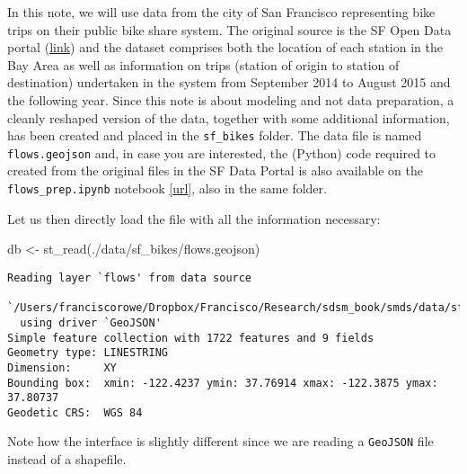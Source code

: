 \documentclass[
  letterpaper,
  krantz2]{style/krantz}
\newenvironment{Shaded}{\begin{snugshade}}{\end{snugshade}}
\newcommand{\CommentTok}[1]{\textcolor[rgb]{0.37,0.37,0.37}{#1}}
\newcommand{\FunctionTok}[1]{\textcolor[rgb]{0.28,0.35,0.67}{#1}}
\newcommand{\NormalTok}[1]{\textcolor[rgb]{0.00,0.23,0.31}{#1}}
\newcommand{\OtherTok}[1]{\textcolor[rgb]{0.00,0.23,0.31}{#1}}
\newcommand{\StringTok}[1]{\textcolor[rgb]{0.13,0.47,0.30}{#1}}
\begin{document}
In this note, we will use data from the city of San Francisco
representing bike trips on their public bike share system. The original
source is the SF Open Data portal
(\href{http://www.bayareabikeshare.com/open-data}{link}) and the dataset
comprises both the location of each station in the Bay Area as well as
information on trips (station of origin to station of destination)
undertaken in the system from September 2014 to August 2015 and the
following year. Since this note is about modeling and not data
preparation, a cleanly reshaped version of the data, together with some
additional information, has been created and placed in the
\texttt{sf\_bikes} folder. The data file is named \texttt{flows.geojson}
and, in case you are interested, the (Python) code required to created
from the original files in the SF Data Portal is also available on the
\texttt{flows\_prep.ipynb} notebook
\href{https://github.com/darribas/spa_notes/blob/master/sf_bikes/flows_prep.ipynb}{{[}url{]}},
also in the same folder.

Let us then directly load the file with all the information necessary:

\begin{Shaded}
\begin{Highlighting}[]
\NormalTok{db }\OtherTok{\textless{}{-}} \FunctionTok{st\_read}\NormalTok{(}\StringTok{\textquotesingle{}./data/sf\_bikes/flows.geojson\textquotesingle{}}\NormalTok{)}
\end{Highlighting}
\end{Shaded}

\begin{verbatim}
Reading layer `flows' from data source 
  `/Users/franciscorowe/Dropbox/Francisco/Research/sdsm_book/smds/data/sf_bikes/flows.geojson' 
  using driver `GeoJSON'
Simple feature collection with 1722 features and 9 fields
Geometry type: LINESTRING
Dimension:     XY
Bounding box:  xmin: -122.4237 ymin: 37.76914 xmax: -122.3875 ymax: 37.80737
Geodetic CRS:  WGS 84
\end{verbatim}

\begin{Shaded}
\end{Shaded}

Note how the interface is slightly different since we are reading a
\texttt{GeoJSON} file instead of a shapefile.
\end{document}
